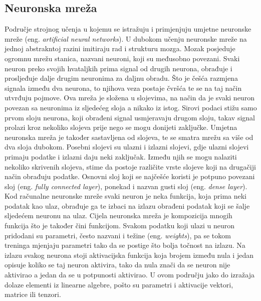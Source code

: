 \subsection{Neuronska mreža}
Područje strojnog učenja u kojemu se istražuju i primjenjuju umjetne neuronske mreže (eng. \textit{artificial neural networks}). U dubokom učenju neuronske mreže na jednoj abstrakntoj razini imitiraju rad i strukturu mozga. Mozak posjeduje ogromnu mrežu stanica, nazvani neuroni, koji su međusobno povezani. Svaki neuron preko svojih hvataljkih prima signal od drugih neurona, obrađuje i prosljeđuje dalje drugim neuronima za daljnu obradu. Što je češća razmjena signala između dva neurona, to njihova veza postaje čvršća te se na taj način utvrđuju pojmove. Ova mreža je složena u slojevima, na način da je svaki neuron povezan sa neuronima iz sljedećeg sloja a nikako iz istog. Sirovi podaci stižu samo prvom sloju neurona, koji obrađeni signal usmjeravaju drugom sloju, takav signal prolazi kroz nekoliko slojeva prije nego se mogu donijeti zaključke. Umjetna neuronska mreža je također sastavljena od slojeva, te se smatra mrežu sa više od dva sloja dubokom. Posebni slojevi su ulazni i izlazni slojevi, gdje ulazni slojevi primaju podatke i izlazni daju neki zaključak. Između njih se mogu nalaziti nekoliko skrivenih slojeva, stime da postoje različite vrste slojeve koji na drugačiji način obrađuju podatke. Osnovni sloj koji se najčešće koristi je potpuno povezani sloj (eng. \textit{fully connected layer}), ponekad i nazvan gusti sloj (eng. \textit{dense layer}). Kod računalne neuronske mreže svaki neuron je neka funkcija, koja prima neki podatak kao ulaz, obrađuje ga te izbaci na izlazu obrađeni podatak koji se šalje sljedećem neuronu na ulaz. Cijela neuronska mreža je kompozicija mnogih funkcija što je također čini funkcijom. Svakom podatku koji ulazi u neuron pridodani su parametri, često nazvani i težine (eng. \textit{weights}), pa se tokom treninga mjenjaju parametri tako da se postige što bolja točnost na izlazu. Na izlazu svakog neurona stoji aktivacijska funkcija koja brojem između nula i jedan opisuje koliko se taj neuron aktivira, tako da nula znači da se neuron nije aktivirao a jedan da se u potpunosti aktivirao. U ovom području jako do izražaja dolaze elementi iz linearne algebre, pošto su parametri i aktivacije vektori, matrice ili tenzori. 

